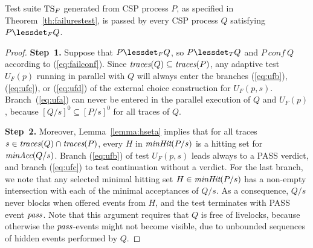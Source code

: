 \begin{lemma}\label{lemma:mainfsound}
Test suite ${\text{TS}}_F$ generated from CSP process $P$, as specified in Theorem~\ref{th:failurestest}, is passed by
every CSP process $Q$ satisfying $P\lessdet_F Q$.
\end{lemma}
\begin{proof}
{\bf Step~1.}
Suppose that $P\lessdet_F Q$, so $P\lessdet_T Q$ and  $P\ conf\ Q$ 
according to (\ref{eq:failconf}). 
Since   $\text{\it traces}(Q)\subseteq
\text{\it traces}(P)$,   any adaptive test
$U_F(p)$ running in parallel with $Q$ will always enter the branches (\ref{eq:ufb}), (\ref{eq:ufc}), or
(\ref{eq:ufd}) of the external choice construction for $U_F(p,s)$.
Branch~(\ref{eq:ufa}) can never be entered in the parallel execution of $Q$
and $U_F(p)$, because $[Q/s]^0\subseteq [P/s]^0$ for all traces of $Q$.

{\bf Step~2.}
Moreover,  Lemma~\ref{lemma:hseta}
implies that for all traces $s\in\text{\it traces}(Q)\cap\text{\it traces}(P)$, every $H$ in $\text{\it minHit}(P/s)$ is
a hitting set for $\text{\it minAcc}(Q/s)$. Branch (\ref{eq:ufb}) of test $U_F(p,s)$ 
leads always to a PASS verdict, and branch
(\ref{eq:ufc}) to test continuation without a verdict. For the last branch,
we note that any selected minimal hitting set $H\in\text{\it minHit}(P/s)$ has a
non-empty intersection with each of the minimal acceptances of $Q/s$. As a
consequence, $Q/s$ never blocks when offered events from $H$, and the test
terminates with PASS event ${\text{\it pass}}$. Note that this argument requires that
$Q$ is free of livelocks, because otherwise the ${\text{\it pass}}$-events might not become
visible, due to unbounded sequences of hidden events performed by $Q$.
\xbox
\end{proof}

